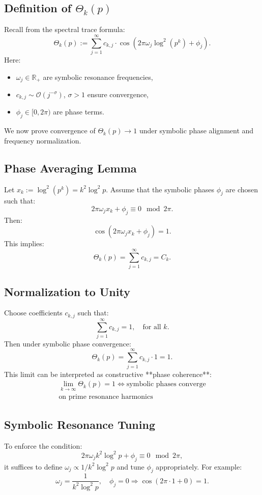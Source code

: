 \subsection*{Definition of \( \Theta_k(p) \)}
Recall from the spectral trace formula:
\[
\Theta_k(p) := \sum_{j=1}^\infty c_{k,j} \cdot \cos(2\pi \omega_j \log^2(p^k) + \phi_j).
\]
Here:
\begin{itemize}
  \item \( \omega_j \in \mathbb{R}_+ \) are symbolic resonance frequencies,
  \item \( c_{k,j} \sim \mathcal{O}(j^{-\sigma}) \), \( \sigma > 1 \) ensure convergence,
  \item \( \phi_j \in [0,2\pi) \) are phase terms.
\end{itemize}

We now prove convergence of \( \Theta_k(p) \to 1 \) under symbolic phase alignment and frequency normalization.

\subsection*{Phase Averaging Lemma}
Let \( x_k := \log^2(p^k) = k^2 \log^2 p \). Assume that the symbolic phases \( \phi_j \) are chosen such that:
\[
2\pi \omega_j x_k + \phi_j \equiv 0 \mod 2\pi.
\]
Then:
\[
\cos(2\pi \omega_j x_k + \phi_j) = 1.
\]
This implies:
\[
\Theta_k(p) = \sum_{j=1}^\infty c_{k,j} = C_k.
\]

\subsection*{Normalization to Unity}
Choose coefficients \( c_{k,j} \) such that:
\[
\sum_{j=1}^\infty c_{k,j} = 1, \quad \text{for all } k.
\]
Then under symbolic phase convergence:
\[
\Theta_k(p) = \sum_{j=1}^\infty c_{k,j} \cdot 1 = 1.
\]
This limit can be interpreted as constructive **phase coherence**:
\[
\boxed{
\begin{aligned}
\lim_{k \to \infty} \Theta_k(p) = 1 \iff \text{symbolic phases converge} \\
\text{on prime resonance harmonics}
\end{aligned}
}
\]

\subsection*{Symbolic Resonance Tuning}
To enforce the condition:
\[
2\pi \omega_j k^2 \log^2 p + \phi_j \equiv 0 \mod 2\pi,
\]
it suffices to define \( \omega_j \propto 1/k^2 \log^2 p \) and tune \( \phi_j \) appropriately. For example:
\[
\omega_j = \frac{1}{k^2 \log^2 p}, \quad \phi_j = 0 \Rightarrow \cos(2\pi \cdot 1 + 0) = 1.
\]

